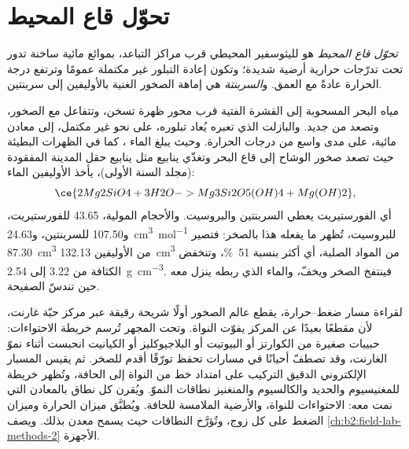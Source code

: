 \section{تحوّل قاع المحيط}\label{sec:b2:pt-paths:ocean-floor}

\begin{definition}\label{def:b2:pt-paths:ocean-floor}
\emph{تحوّل قاع المحيط} هو 
لليثوسفير المحيطي قرب مراكز التباعد، بموائع مائية ساخنة
تدور تحت تدرّجات حرارية أرضية شديدة؛ وتكون إعادة التبلور غير مكتملة عمومًا
وترتفع درجة الحرارة عادةً مع العمق. و\emph{السربنتة}
هي إماهة الصخور الغنية بالأوليفين إلى سربنتين.
\end{definition}

مياه البحر المسحوبة إلى القشرة الفتية قرب محور ظهرة تسخن، وتتفاعل مع الصخور،
وتصعد من جديد. والبازلت الذي تعبره يُعاد تبلوره، على نحو غير مكتمل، إلى معادن
مائية، على مدى واسع من درجات الحرارة. وحيث يبلغ الماء ، كما في
الظهرات البطيئة حيث تصعد صخور الوشاح إلى قاع البحر وتغذّي ينابيع مثل
ينابيع حقل المدينة المفقودة (مجلد السنة الأولى)، يأخذ الأوليفين الماء:
\[
\ce{2 Mg2SiO4 + 3 H2O -> Mg3Si2O5(OH)4 + Mg(OH)2},
\]
أي الفورستيريت يعطي السربنتين والبروسيت. والأحجام المولية، 43.65 للفورستيريت، و107.50
للسربنتين، و\qty{24.63}{cm^3.mol^{-1}} للبروسيت، تُظهر ما يفعله هذا بالصخر:
فتصير \qty{87.30}{cm^3} من الأوليفين \qty{132.13}{cm^3} من المواد الصلبة، أي أكثر بنسبة \qty{51}{\percent}،
وتنخفض الكثافة من 3.22 إلى \qty{2.54}{g.cm^{-3}}. فينتفخ الصخر
ويخفّ، والماء الذي ربطه ينزل معه حين تندسّ الصفيحة.

\begin{inthelab}
لقراءة مسار ضغط--حرارة، يقطع عالم الصخور أولًا شريحة رقيقة عبر مركز
حبّة غارنت، لأن مقطعًا بعيدًا عن المركز يفوّت النواة. وتحت المجهر تُرسم خريطة الاحتواءات:
حبيبات صغيرة من الكوارتز أو البيوتيت أو البلاجيوكليز أو الكيانيت انحبست أثناء نموّ
الغارنت، وقد تصطفّ أحيانًا في مسارات تحفظ تورّقًا أقدم للصخر. ثم يقيس
المسبار الإلكتروني الدقيق التركيب على امتداد خط من النواة إلى الحافة، وتُظهر خريطة
للمغنيسيوم والحديد والكالسيوم والمنغنيز نطاقات النموّ. ويُقرن كل نطاق
بالمعادن التي نمت معه: الاحتواءات للنواة، والأرضية الملامسة
للحافة. ويُطبَّق ميزان الحرارة وميزان الضغط على كل زوج، وتُؤرَّخ النطاقات حيث يسمح
معدن بذلك. ويصف \cref{ch:b2:field-lab-methods-2} الأجهزة.
\end{inthelab}

